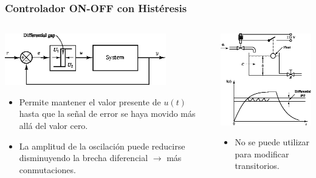 \documentclass[aspectratio=169,handout]{beamer}
\theoremstyle{definition}
\theoremstyle{plain}
\theoremstyle{remark}
\begin{document}
\begin{frame}[<+->]\frametitle{Controlador ON-OFF con Histéresis}
\begin{columns}
  \begin{column}{0.5\textwidth}
    \vspace*{5mm}
    \includegraphics[width=7cm]{images/onoffcontrollerHisteresis.eps}
    \vspace*{-5mm}
    \begin{itemize}
      \item Permite mantener el valor presente de $u(t)$ hasta que la señal de error se haya movido más allá del valor cero.
      \item La amplitud de la oscilación puede reducirse disminuyendo la brecha diferencial $\rightarrow$ más conmutaciones.
    \end{itemize}
  \end{column} 
  \begin{column}{0.5\textwidth}
    \begin{center}
    \includegraphics[width=5.5cm]{images/onoffcontrollerLevel.eps}
    \end{center}
    \vspace*{-5mm}
    \begin{itemize}
      \item No se puede utilizar para modificar transitorios.
    \end{itemize}
  \end{column} 
\end{columns}
\end{frame}
\end{document}
